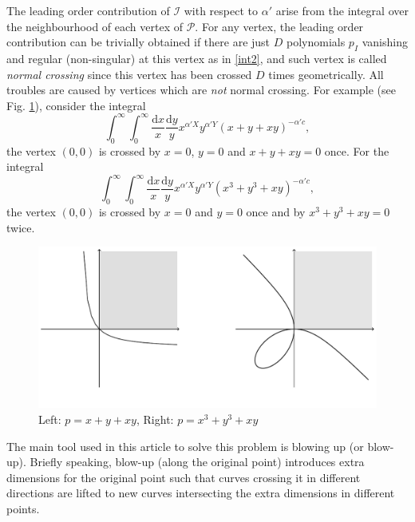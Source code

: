 \documentclass[12pt]{article}
\theoremstyle{definition}
\theoremstyle{plain}
\newcommand{\dif}{\mathrm{d}} %
\begin{document}
The leading order contribution of $\mathcal{I}$ with respect to $\alpha'$ arise from the integral over the neighbourhood of each vertex of $\mathcal{P}$. For any vertex, the leading order contribution can be trivially obtained if there are just $D$ polynomials $p_{I}$ vanishing and regular (non-singular) at this vertex as in \eqref{int2}, and such vertex is called {\it{normal crossing}} since this vertex has been crossed $D$ times geometrically. All troubles are caused by vertices which are {\it not} normal crossing. For example (see Fig. \ref{fig_1}), consider the integral 
\begin{equation}\label{exam:1}
	\int_0^\infty \int_0^\infty \frac{\dif x}{x}\frac{\dif y}{y}x^{\alpha' X}
	y^{\alpha' Y}(x+y+ xy)^{-\alpha' c},
\end{equation}
the vertex $(0,0)$ is crossed by $x=0$, $y=0$ and $x+y+xy=0$ once. 
For the integral
\begin{equation}\label{exam:2}
\int_0^\infty \int_0^\infty \frac{\dif x}{x}\frac{\dif y}{y}x^{\alpha' X}
y^{\alpha' Y}(x^3+y^3+ xy)^{-\alpha' c},
\end{equation}
the vertex $(0,0)$ is crossed by $x=0$ and $y=0$ once and by $x^3+y^3+xy=0$ twice. 

\begin{figure}[h]
\begin{center}
\includegraphics[scale=0.75]{fig_1.pdf}
\end{center}
\vspace{-5ex}
\caption{Left: $p=x+y+xy$, Right: $p=x^3+y^3+xy$}
\label{fig_1}
\end{figure}

The main tool used in this article to solve this problem is blowing up (or blow-up).
Briefly speaking, blow-up (along the original point) introduces extra dimensions for the original point such that
curves crossing it in different directions are lifted to new curves intersecting the extra dimensions in different points.
\end{document}
